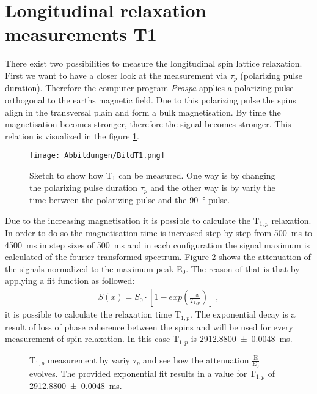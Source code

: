 \section{Longitudinal relaxation measurements T1}
\label{sec:LongitudinalrelaxationmeasurementsT1}
There exist two possibilities to measure the longitudinal spin lattice relaxation. First we want to have a closer look at the measurement via $\tau_p$ (polarizing pulse duration). Therefore the computer program \textit{Prospa} applies a polarizing pulse orthogonal to the earths magnetic field. Due to this polarizing pulse the spins align in the transversal plain and form a bulk magnetisation. By time the magnetisation becomes stronger, therefore the signal becomes stronger. This relation is visualized in the figure \ref{fig:BildT1}.

\begin{figure}[H]
    \centering
    \texttt{[image: Abbildungen/BildT1.png]}   
    \caption[Sketch to show how T$_1$ can be measured. \cite{Bild}]{Sketch to show how T$_1$ can be measured. One way is by changing the polarizing pulse duration $\tau_p$ and the other way is by variy the time between the polarizing pulse and the \SI{90}{\degree} pulse. \cite{Bild}}
    \label{fig:BildT1}
\end{figure}

Due to the increasing magnetisation it is possible to calculate the T$_{1,p}$ relaxation. In order to do so the magnetisation time is increased step by step from \SI{500}{\milli \second} to \SI{4500}{\milli \second} in step sizes of \SI{500}{\milli \second} and in each configuration the signal maximum is calculated of the fourier transformed spectrum. Figure \ref{fig:T1Polarisationsfeldfeld} shows the attenuation of the signals normalized to the maximum peak E$_0$. The reason of that is that by applying a fit function as followed:
\begin{align}
    S(x)=S_0 \cdot [1-exp(\frac{-x}{T_{1,p}})] \ ,
    \label{eq: fitBp}
\end{align}
it is possible to calculate the relaxation time T$_{1,p}$. The exponential decay is a result of loss of phase coherence between the spins and will be used for every measurement of spin relaxation. In this case T$_{1,p}$ is \SI{2912.8800 \pm 0.0048}{\milli \second}.

\begin{figure}[H]
    \centering
    
    \caption[T$_{1,p}$ measurement by variy $\tau_p$ and see how the attenuation $\frac{\text{E}}{\text{E}_0}$ evolves.]{T$_{1,p}$ measurement by variy $\tau_p$ and see how the attenuation $\frac{\text{E}}{\text{E}_0}$ evolves. The provided exponential fit results in a value for T$_{1,p}$ of \SI{2912.8800 \pm 0.0048}{\milli \second}.}
    \label{fig:T1Polarisationsfeldfeld}
\end{figure}

